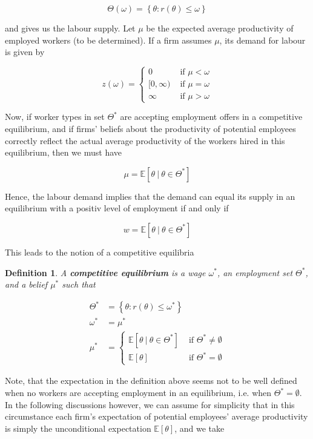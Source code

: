 \documentclass[11pt]{article}
\newtheorem{definition}{Definition}
\begin{document}
	$$ \Theta(\omega) = \left\{ \theta \colon r(\theta) \leq \omega \right\} $$
	
and gives us the labour supply. Let $\mu$ be the expected average productivity of employed workers (to be determined). If a firm assumes $\mu$, its demand for labour is given by

	$$ z(\omega)= \begin{cases} 0 & \text{ if } \mu < \omega \\ [0, \infty) & \text{ if } \mu = \omega \\ \infty & \text{ if } \mu > \omega \end{cases} $$ 
	
Now, if worker types in set $\Theta^*$ are accepting employment offers in a competitive equilibrium, and if firms' beliefs about the productivity of potential employees correctly reflect the actual average productivity of the workers hired in this equilibrium, then we must have 

	$$ \mu = \mathbb{E} \left[\theta ~|~\theta \in \Theta^* \right] $$
	
	Hence, the labour demand implies that the demand can equal its supply in an equilibrium with a positiv level of employment if and only if 
	
	$$ w = \mathbb{E} \left[ \theta ~|~ \theta \in \Theta^* \right] $$
	
	This leads to the notion of a competitive equilibria
	
	\begin{definition}
		A \textbf{competitive equilibrium} is a wage $\omega^*$, an employment set $\Theta^*$, and a belief $\mu^*$ such that
		
		\begin{align*}
			\Theta^* & = \left\{ \theta \colon r(\theta) \leq \omega^* \right\} \\
			\omega^* & = \mu^* \\
			\mu^* & = \begin{cases} \mathbb{E} \left[ \theta ~|~\theta \in \Theta^* \right] & \text{ if } \Theta^* \neq \emptyset \\ \mathbb{E} \left[ \theta \right] & \text{ if } \Theta^* = \emptyset \end{cases}
		\end{align*}
	\end{definition}

Note, that the expectation in the definition above seems not to be well defined when no workers are accepting employment in an equilibrium, i.e. when $\Theta^* = \emptyset$. In the following discussions however, we can assume for simplicity that in this circumstance each firm's expectation of potential employees' average productivity is simply the unconditional expectation $\mathbb{E} \left[ \theta \right]$, and we take 
\end{document}
